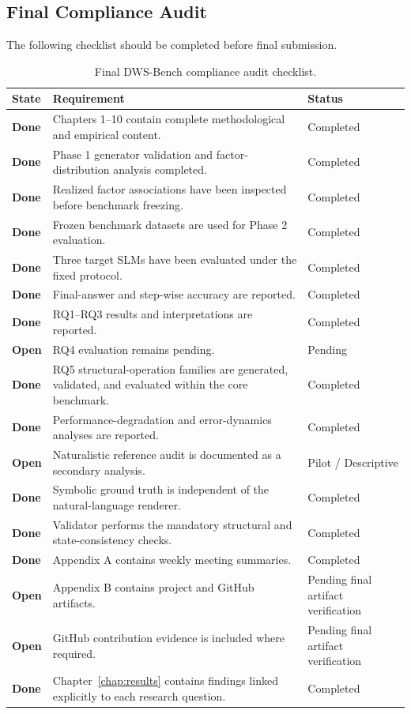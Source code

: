 \documentclass{iutbscthesis}
\begin{document}
\begin{appendices}
\chapter{Final Compliance Audit}
The following checklist should be completed before final submission.
\begin{table}[H]
\centering
\small
\renewcommand{\arraystretch}{1.4}
\begin{tabular}{|p{}|p{}|p{}|}
\hline
\textbf{State} & \textbf{Requirement} & \textbf{Status} \\
\hline
\textbf{Done} & Chapters 1--10 contain complete methodological and empirical content. & Completed \\
\hline
\textbf{Done} & Phase 1 generator validation and factor-distribution analysis completed. & Completed \\
\hline
\textbf{Done} & Realized factor associations have been inspected before benchmark freezing. & Completed \\
\hline
\textbf{Done} & Frozen benchmark datasets are used for Phase 2 evaluation. & Completed \\
\hline
\textbf{Done} & Three target SLMs have been evaluated under the fixed protocol. & Completed \\
\hline
\textbf{Done} & Final-answer and step-wise accuracy are reported. & Completed \\
\hline
\textbf{Done} & RQ1--RQ3 results and interpretations are reported. & Completed \\
\hline
\textbf{Open} & RQ4 evaluation remains pending. & Pending \\
\hline
\textbf{Done} & RQ5 structural-operation families are generated, validated, and evaluated within the core benchmark. & Completed \\
\hline
\textbf{Done} & Performance-degradation and error-dynamics analyses are reported. & Completed \\
\hline
\textbf{Open} & Naturalistic reference audit is documented as a secondary analysis. & Pilot / Descriptive \\
\hline
\textbf{Done} & Symbolic ground truth is independent of the natural-language renderer. & Completed \\
\hline
\textbf{Done} & Validator performs the mandatory structural and state-consistency checks. & Completed \\
\hline
\textbf{Done} & Appendix A contains weekly meeting summaries. & Completed \\
\hline
\textbf{Open} & Appendix B contains project and GitHub artifacts. & Pending final artifact verification \\
\hline
\textbf{Open} & GitHub contribution evidence is included where required. & Pending final artifact verification \\
\hline
\textbf{Done} & Chapter~\ref{chap:results} contains findings linked explicitly to each research question. & Completed \\
\hline
\end{tabular}
\caption{Final DWS-Bench compliance audit checklist.}
\label{tab:final-audit}
\end{table}
\normalsize


\end{appendices}
\end{document}

